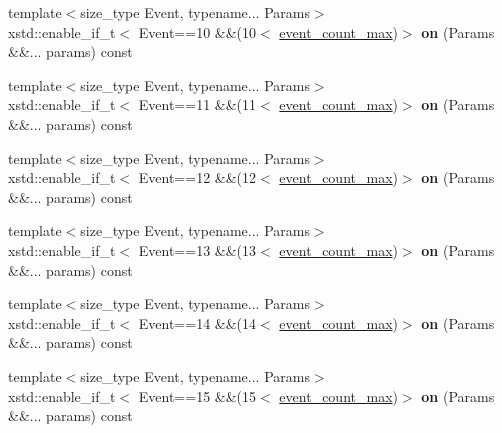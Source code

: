 \begin{DoxyCompactItemize}
{\footnotesize template$<$size\+\_\+type Event, typename... Params$>$ }\\xstd\+::enable\+\_\+if\+\_\+t$<$ Event==10 \&\&(10$<$ \hyperlink{classgko_1_1log_1_1Logger_a8794cd4bf2fd4d24ba9879bdca884dab}{event\+\_\+count\+\_\+max})$>$ {\bfseries on} (Params \&\&... params) const
\item 
\mbox{\label{classgko_1_1log_1_1Logger_a5e736816ad00e39f23804bc4dc646ae1}} 
{\footnotesize template$<$size\+\_\+type Event, typename... Params$>$ }\\xstd\+::enable\+\_\+if\+\_\+t$<$ Event==11 \&\&(11$<$ \hyperlink{classgko_1_1log_1_1Logger_a8794cd4bf2fd4d24ba9879bdca884dab}{event\+\_\+count\+\_\+max})$>$ {\bfseries on} (Params \&\&... params) const
\item 
\mbox{\label{classgko_1_1log_1_1Logger_a81a639d84f4714eedbe460e070c319a9}} 
{\footnotesize template$<$size\+\_\+type Event, typename... Params$>$ }\\xstd\+::enable\+\_\+if\+\_\+t$<$ Event==12 \&\&(12$<$ \hyperlink{classgko_1_1log_1_1Logger_a8794cd4bf2fd4d24ba9879bdca884dab}{event\+\_\+count\+\_\+max})$>$ {\bfseries on} (Params \&\&... params) const
\item 
\mbox{\label{classgko_1_1log_1_1Logger_ad39294a686d9c1e09f35869f515ed475}} 
{\footnotesize template$<$size\+\_\+type Event, typename... Params$>$ }\\xstd\+::enable\+\_\+if\+\_\+t$<$ Event==13 \&\&(13$<$ \hyperlink{classgko_1_1log_1_1Logger_a8794cd4bf2fd4d24ba9879bdca884dab}{event\+\_\+count\+\_\+max})$>$ {\bfseries on} (Params \&\&... params) const
\item 
\mbox{\label{classgko_1_1log_1_1Logger_ac8359fe56734b84d1269a94f5d2a6c38}} 
{\footnotesize template$<$size\+\_\+type Event, typename... Params$>$ }\\xstd\+::enable\+\_\+if\+\_\+t$<$ Event==14 \&\&(14$<$ \hyperlink{classgko_1_1log_1_1Logger_a8794cd4bf2fd4d24ba9879bdca884dab}{event\+\_\+count\+\_\+max})$>$ {\bfseries on} (Params \&\&... params) const
\item 
\mbox{\label{classgko_1_1log_1_1Logger_a23fed86e52006c9f54eec18703c45961}} 
{\footnotesize template$<$size\+\_\+type Event, typename... Params$>$ }\\xstd\+::enable\+\_\+if\+\_\+t$<$ Event==15 \&\&(15$<$ \hyperlink{classgko_1_1log_1_1Logger_a8794cd4bf2fd4d24ba9879bdca884dab}{event\+\_\+count\+\_\+max})$>$ {\bfseries on} (Params \&\&... params) const

\end{DoxyCompactItemize}
